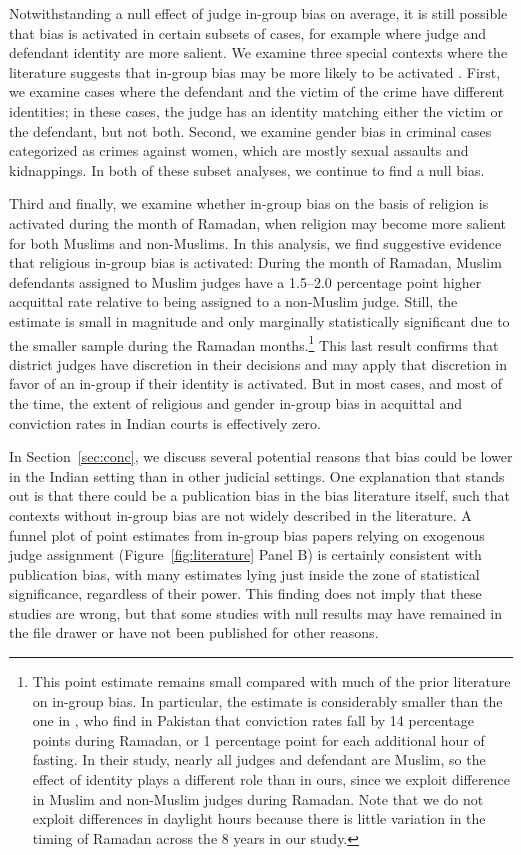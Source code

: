 \documentclass[12pt,english]{article}
\begin{document}
Notwithstanding a null effect of judge in-group bias on average, it is still possible that bias is activated in certain subsets of cases, for example where judge and defendant identity are more salient. We examine three special contexts where the literature suggests that in-group bias may be more likely to be activated \citep{mullen1992ingroup,ShayoZussman2011QJE,AnwarBayerHjalmarsson2012TQJoE,Mehmood2020}. First, we examine cases where the defendant and the victim of the crime have different identities; in these cases, the judge has an identity matching either the victim or the defendant, but not both. Second, we examine gender bias in criminal cases categorized as crimes against women, which are mostly sexual assaults and kidnappings. In both of these subset analyses, we continue to find a null bias.

Third and finally, we examine whether in-group bias on the basis of religion is activated during the month of Ramadan, when religion may become more salient for both Muslims and non-Muslims. In this analysis, we find suggestive evidence that religious in-group bias is activated: During the month of Ramadan, Muslim defendants assigned to Muslim judges have a 1.5--2.0 percentage point higher acquittal rate relative to being assigned to a non-Muslim judge. Still, the estimate is small in magnitude and only marginally statistically significant due to the smaller sample during the Ramadan months.\footnote{This point estimate remains small compared with much of the prior literature on in-group bias. In particular, the estimate is considerably smaller than the one in \citet{Mehmood2020}, who find in Pakistan that conviction rates fall by 14 percentage points during Ramadan, or 1 percentage point for each additional hour of fasting. In their study, nearly all judges and defendant are Muslim, so the effect of identity plays a different role than in ours, since we exploit difference in Muslim and non-Muslim judges during Ramadan. Note that we do not exploit differences in daylight hours because there is little variation in the timing of Ramadan across the 8 years in our study.} This last result confirms that district judges have discretion in their decisions and may apply that discretion in favor of an in-group if their identity is activated. But in most cases, and most of the time, the extent of religious and gender in-group bias in acquittal and conviction rates in Indian courts is effectively zero. 

In Section~\ref{sec:conc}, we discuss several potential reasons that bias could be lower in the Indian setting than in other judicial settings. One explanation that stands out is that there could be a publication bias in the bias literature itself, such that contexts without in-group bias are not widely described in the literature. A funnel plot of point estimates from in-group bias papers relying on exogenous judge assignment (Figure~\ref{fig:literature} Panel B) is certainly consistent with publication bias, with many estimates lying just inside the zone of statistical significance, regardless of their power. This finding does not imply that these studies are wrong, but that some studies with null results may have remained in the file drawer or have not been published for other reasons.
\end{document}
